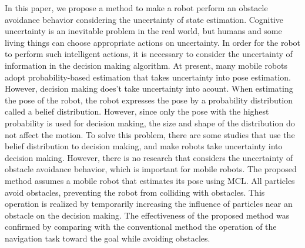 \begin{eabstract}
In this paper, we propose a method to make a robot perform an obstacle avoidance behavior considering the uncertainty of state estimation.
Cognitive uncertainty is an inevitable problem in the real world, but humans and some living things can choose appropriate actions on uncertainty.
In order for the robot to perform such intelligent actions, it is necessary to consider the uncertainty of information in the decision making algorithm.
At present, many mobile robots adopt probability-based estimation that takes uncertainty into pose estimation.
However, decision making does’t take uncertainty into acount.
When estimating the pose of the robot, the robot expresses the pose by a probability distribution called a belief distribution.
However, since only the pose with the highest probability is used for decision making, the size and shape of the distribution do not affect the motion.
To solve this problem, there are some studies that use the belief distribution to decision making, and make robots take uncertainty into decision making.
However, there is no research that considers the uncertainty of obstacle avoidance behavior, which is important for mobile robots.
The proposed method assumes a mobile robot that estimates its pose using MCL.
All particles avoid obstacles, preventing the robot from colliding with obstacles.
This operation is realized by temporarily increasing the influence of particles near an obstacle on the decision making.
The effectiveness of the proposed method was confirmed by comparing with the conventional method the operation of the navigation task toward the goal while avoiding obstacles.
\end{eabstract}

